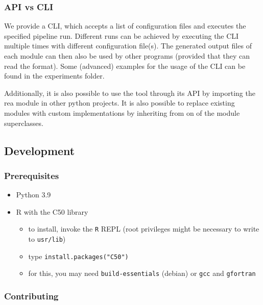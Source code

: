 \documentclass[
]{article}
\providecommand{\tightlist}{%
  \setlength{\itemsep}{0pt}\setlength{\parskip}{0pt}}
\begin{document}
\hypertarget{api-vs-cli}{%
\subsubsection{API vs CLI}\label{api-vs-cli}}

We provide a CLI, which accepts a list of configuration files and
executes the specified pipeline run. Different runs can be achieved by
executing the CLI multiple times with different configuration file(s).
The generated output files of each module can then also be used by other
programs (provided that they can read the format). Some (advanced)
examples for the usage of the CLI can be found in the experiments
folder.

Additionally, it is also possible to use the tool through its API by
importing the rea module in other python projects. It is also possible
to replace existing modules with custom implementations by inheriting
from on of the module superclasses.

\hypertarget{development}{%
\subsection{Development}\label{development}}

\hypertarget{prerequisites}{%
\subsubsection{Prerequisites}\label{prerequisites}}

\begin{itemize}
\tightlist
\item
  Python 3.9
\item
  R with the C50 library

  \begin{itemize}
  \tightlist
  \item
    to install, invoke the \texttt{R} REPL (root privileges might be
    necessary to write to \texttt{usr/lib})
  \item
    type \texttt{install.packages("C50")}
  \item
    for this, you may need \texttt{build-essentials} (debian) or
    \texttt{gcc} and \texttt{gfortran}
  \end{itemize}
\end{itemize}

\hypertarget{contributing}{%
\subsubsection{Contributing}\label{contributing}}
\end{document}
